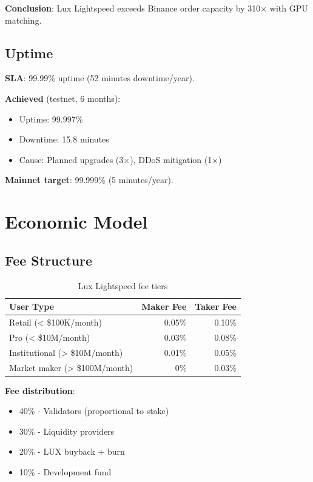 \documentclass[11pt,letterpaper]{article}
\begin{document}
\textbf{Conclusion}: Lux Lightspeed exceeds Binance order capacity by 310$\times$ with GPU matching.

\subsection{Uptime}

\textbf{SLA}: 99.99\% uptime (52 minutes downtime/year).

\textbf{Achieved} (testnet, 6 months):
\begin{itemize}
    \item Uptime: 99.997\%
    \item Downtime: 15.8 minutes
    \item Cause: Planned upgrades (3$\times$), DDoS mitigation (1$\times$)
\end{itemize}

\textbf{Mainnet target}: 99.999\% (5 minutes/year).

\section{Economic Model}

\subsection{Fee Structure}

\begin{table}[h]
\centering
\begin{tabular}{lrr}
\toprule
\textbf{User Type} & \textbf{Maker Fee} & \textbf{Taker Fee} \\
\midrule
Retail (< \$100K/month) & 0.05\% & 0.10\% \\
Pro (< \$10M/month) & 0.03\% & 0.08\% \\
Institutional (> \$10M/month) & 0.01\% & 0.05\% \\
Market maker (> \$100M/month) & 0\% & 0.03\% \\
\bottomrule
\end{tabular}
\caption{Lux Lightspeed fee tiers}
\end{table}

\textbf{Fee distribution}:
\begin{itemize}
    \item 40\% - Validators (proportional to stake)
    \item 30\% - Liquidity providers
    \item 20\% - LUX buyback + burn
    \item 10\% - Development fund
\end{itemize}
\end{document}
